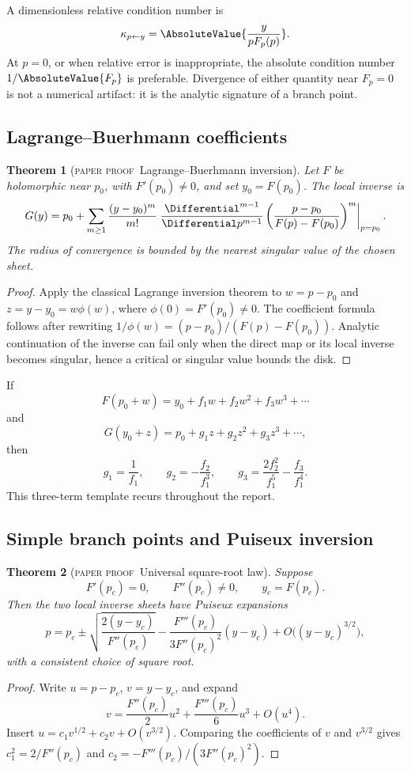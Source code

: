 \documentclass[11pt,oneside]{article}
\newtheorem{theorem}{Theorem}[section]
\theoremstyle{definition}
\theoremstyle{remark}
\theoremstyle{plain}
\theoremstyle{definition}
\theoremstyle{remark}
\newcommand{\statusproved}{\textcolor{provedgreen}{\textsc{paper proof}}}
\numberwithin{equation}{section}
\numberwithin{figure}{section}
\numberwithin{table}{section}
\let\reportsubsection\subsection
\let\reportsubsubsection\subsubsection
\let\section\reportsubsection
\let\subsection\reportsubsubsection
\begin{document}
A dimensionless relative condition number is
\[
 \kappa_{p\leftarrow y}
 =\AbsoluteValue{\frac{y}{pF_p(p)}}.
\]
At \(p=0\), or when relative error is inappropriate, the absolute condition
number \(1/\AbsoluteValue{F_p}\) is preferable.  Divergence of either quantity near
\(F_p=0\) is not a numerical artifact: it is the analytic signature of a
branch point.

\section{Lagrange--Buerhmann coefficients}
\begin{theorem}[\statusproved\ Lagrange--Buerhmann inversion]
Let \(F\) be holomorphic near \(p_0\), with \(F'(p_0)\ne0\), and set
\(y_0=F(p_0)\).  The local inverse is
\[
 G(y)=p_0+\sum_{m\ge1}\frac{(y-y_0)^m}{m!}
 \left.
 \frac{\Differential^{m-1}}{\Differential p^{m-1}}
 \left(\frac{p-p_0}{F(p)-F(p_0)}\right)^m
 \right|_{p=p_0}.
\]
The radius of convergence is bounded by the nearest singular value of the
chosen sheet.
\end{theorem}
\begin{proof}
Apply the classical Lagrange inversion theorem to
\(w=p-p_0\) and \(z=y-y_0=w\phi(w)\), where
\(\phi(0)=F'(p_0)\ne0\).  The coefficient formula follows after rewriting
\(1/\phi(w)=(p-p_0)/(F(p)-F(p_0))\).  Analytic continuation of the inverse can
fail only when the direct map or its local inverse becomes singular, hence a
critical or singular value bounds the disk.
\end{proof}

If
\[
 F(p_0+w)=y_0+f_1w+f_2w^2+f_3w^3+\cdots
\]
and
\[
 G(y_0+z)=p_0+g_1z+g_2z^2+g_3z^3+\cdots,
\]
then
\[
 g_1=\frac1{f_1},\qquad
 g_2=-\frac{f_2}{f_1^3},\qquad
 g_3=\frac{2f_2^2}{f_1^5}-\frac{f_3}{f_1^4}.
\]
This three-term template recurs throughout the report.

\section{Simple branch points and Puiseux inversion}
\begin{theorem}[\statusproved\ Universal square-root law]
Suppose
\[
 F'(p_c)=0,\qquad F''(p_c)\ne0,
 \qquad y_c=F(p_c).
\]
Then the two local inverse sheets have Puiseux expansions
\[
 p=p_c\pm\sqrt{\frac{2(y-y_c)}{F''(p_c)}}
 -\frac{F'''(p_c)}{3F''(p_c)^2}(y-y_c)
 +O\bigl((y-y_c)^{3/2}\bigr),
\]
with a consistent choice of square root.
\end{theorem}
\begin{proof}
Write \(u=p-p_c\), \(v=y-y_c\), and expand
\[
 v=\frac{F''(p_c)}2u^2+\frac{F'''(p_c)}6u^3+O(u^4).
\]
Insert \(u=c_1v^{1/2}+c_2v+O(v^{3/2})\).  Comparing the coefficients of
\(v\) and \(v^{3/2}\) gives
\(c_1^2=2/F''(p_c)\) and
\(c_2=-F'''(p_c)/(3F''(p_c)^2)\).
\end{proof}
\end{document}

